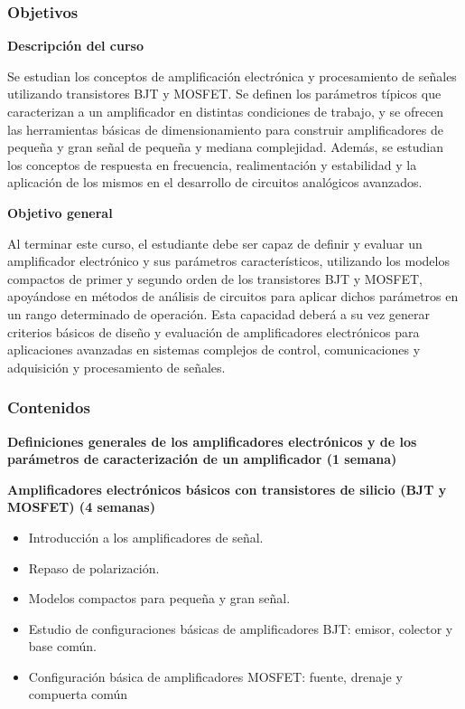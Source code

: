 \begin{frame}[t]
\frametitle{Objetivos}
\textbf{Descripción del curso}

Se estudian los conceptos de amplificación electrónica y procesamiento de señales utilizando transistores BJT y MOSFET. Se definen los parámetros típicos que caracterizan a un amplificador en distintas condiciones de trabajo, y se ofrecen las herramientas básicas de dimensionamiento para construir amplificadores de pequeña y gran señal de pequeña y mediana complejidad. Además, se estudian los conceptos de respuesta en frecuencia, realimentación y estabilidad y la aplicación de los mismos en el desarrollo de circuitos analógicos avanzados.

\textbf{Objetivo general}

Al terminar este curso, el estudiante debe ser capaz de definir y evaluar un amplificador electrónico y sus parámetros característicos, utilizando los modelos compactos de primer y segundo orden de los transistores BJT y MOSFET, apoyándose en métodos de análisis de circuitos para aplicar dichos parámetros en un rango determinado de operación. Esta capacidad deberá a su vez generar criterios básicos de diseño y evaluación de amplificadores electrónicos para aplicaciones avanzadas en sistemas complejos de control, comunicaciones y adquisición y procesamiento de señales.
\end{frame}


\begin{frame}[t]
\frametitle{Contenidos}
\textbf{Definiciones generales de los amplificadores electrónicos y de los parámetros de caracterización de un amplificador (1 semana)}

\vspace{5mm}
\textbf{Amplificadores electrónicos básicos con transistores de silicio (BJT y MOSFET) (4 semanas)}

\begin{itemize}
	\item Introducción a los amplificadores de señal.
	\item Repaso de polarización.
	\item Modelos compactos para pequeña y gran señal.
	\item Estudio de configuraciones básicas de amplificadores BJT: emisor, colector y base común.
	\item Configuración básica de amplificadores MOSFET: fuente, drenaje y compuerta común
\end{itemize}

\end{frame}


